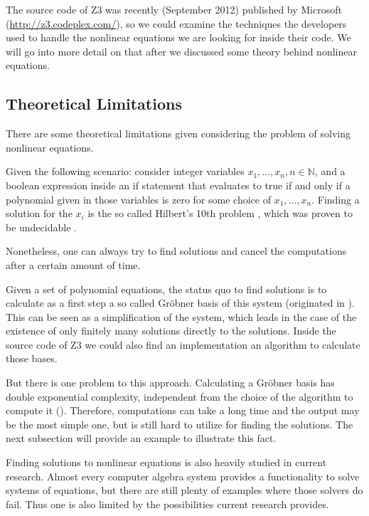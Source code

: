 \documentclass[oribibl]{llncs}
\newcommand{\NN}{{\mathbb{N}}}
\begin{document}
The source code of \textsc{Z3} was recently (September 2012) published
by Microsoft (\url{http://z3.codeplex.com/}), so we could examine the
techniques the developers used to handle the nonlinear equations we
are looking for inside their code. We will go into more detail on that
after we discussed some theory behind nonlinear equations.

\subsection{Theoretical Limitations}

There are some theoretical limitations given considering the problem
of solving nonlinear equations.

Given the following scenario: consider integer variables $x_1, \ldots,
x_n, n \in \NN$, and a boolean expression inside an if statement that
evaluates to true if and only if a polynomial given in those variables
is zero for some choice of $x_1, \ldots, x_n$. Finding a solution for
the $x_i$ is the so called Hilbert's 10th problem
\cite{davis1984hilbert}, which was proven to be undecidable
\cite{matiyasevich1970enumerable}.

Nonetheless, one can always try to find solutions and cancel the
computations after a certain amount of time.

Given a set of polynomial equations, the status quo to find solutions
is to calculate as a first step a so called Gr\"obner basis of this system (originated
in \cite{buchberger1970algorithmisches}). This can be seen as a
simplification of the system, which leads in the case of the existence
of only finitely many solutions directly to the solutions. Inside the
source code of \textsc{Z3} we could also find an implementation an
algorithm to calculate those bases.

But there is one problem to this approach. Calculating a Gr\"obner
basis has double exponential complexity, independent from the choice
of the algorithm to compute it (\cite{mayr1982complexity}). Therefore,
computations can take a long time and the output may be the most
simple one, but is still hard to utilize for finding the
solutions. The next subsection will provide an example to illustrate
this fact.

Finding solutions to nonlinear equations is also heavily studied in current
research. Almost every computer algebra system provides a
functionality to solve systems of equations, but there are still
plenty of examples where those solvers do fail. Thus one is also
limited by the possibilities current research provides.
\end{document}

